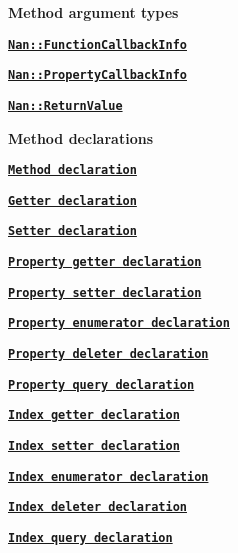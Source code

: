 \begin{DoxyItemize}
\item {\bfseries Method argument types}
\begin{DoxyItemize}
\item \href{doc/methods.md#api_nan_function_callback_info}{\tt {\bfseries {\ttfamily Nan\+::\+Function\+Callback\+Info}}}
\item \href{doc/methods.md#api_nan_property_callback_info}{\tt {\bfseries {\ttfamily Nan\+::\+Property\+Callback\+Info}}}
\item \href{doc/methods.md#api_nan_return_value}{\tt {\bfseries {\ttfamily Nan\+::\+Return\+Value}}}
\end{DoxyItemize}
\item {\bfseries Method declarations}
\begin{DoxyItemize}
\item \href{doc/methods.md#api_nan_method}{\tt {\bfseries Method declaration}}
\item \href{doc/methods.md#api_nan_getter}{\tt {\bfseries Getter declaration}}
\item \href{doc/methods.md#api_nan_setter}{\tt {\bfseries Setter declaration}}
\item \href{doc/methods.md#api_nan_property_getter}{\tt {\bfseries Property getter declaration}}
\item \href{doc/methods.md#api_nan_property_setter}{\tt {\bfseries Property setter declaration}}
\item \href{doc/methods.md#api_nan_property_enumerator}{\tt {\bfseries Property enumerator declaration}}
\item \href{doc/methods.md#api_nan_property_deleter}{\tt {\bfseries Property deleter declaration}}
\item \href{doc/methods.md#api_nan_property_query}{\tt {\bfseries Property query declaration}}
\item \href{doc/methods.md#api_nan_index_getter}{\tt {\bfseries Index getter declaration}}
\item \href{doc/methods.md#api_nan_index_setter}{\tt {\bfseries Index setter declaration}}
\item \href{doc/methods.md#api_nan_index_enumerator}{\tt {\bfseries Index enumerator declaration}}
\item \href{doc/methods.md#api_nan_index_deleter}{\tt {\bfseries Index deleter declaration}}
\item \href{doc/methods.md#api_nan_index_query}{\tt {\bfseries Index query declaration}}
\end{DoxyItemize}

\end{DoxyItemize}
